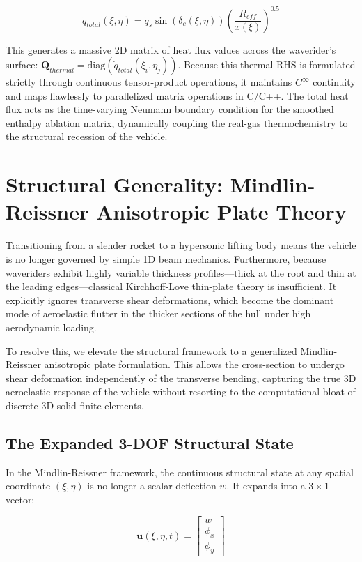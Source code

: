 \documentclass[11pt,a4paper]{article}
\theoremstyle{definition}
\numberwithin{equation}{section}
\begin{document}
$$\dot{q}_{total}(\xi, \eta) = \dot{q}_s \sin(\delta_c(\xi, \eta)) \left( \frac{R_{eff}}{x(\xi)} \right)^{0.5}$$

This generates a massive 2D matrix of heat flux values across the waverider's surface: $\mathbf{Q}_{thermal} = \text{diag}(\dot{q}_{total}(\xi_i, \eta_j))$. Because this thermal RHS is formulated strictly through continuous tensor-product operations, it maintains $C^\infty$ continuity and maps flawlessly to parallelized matrix operations in C/C++. The total heat flux acts as the time-varying Neumann boundary condition for the smoothed enthalpy ablation matrix, dynamically coupling the real-gas thermochemistry to the structural recession of the vehicle.

\section{Structural Generality: Mindlin-Reissner Anisotropic Plate Theory}
\label{sec:structural_generality}
Transitioning from a slender rocket to a hypersonic lifting body means the vehicle is no longer governed by simple 1D beam mechanics. Furthermore, because waveriders exhibit highly variable thickness profiles—thick at the root and thin at the leading edges—classical Kirchhoff-Love thin-plate theory is insufficient. It explicitly ignores transverse shear deformations, which become the dominant mode of aeroelastic flutter in the thicker sections of the hull under high aerodynamic loading.

To resolve this, we elevate the structural framework to a generalized Mindlin-Reissner anisotropic plate formulation. This allows the cross-section to undergo shear deformation independently of the transverse bending, capturing the true 3D aeroelastic response of the vehicle without resorting to the computational bloat of discrete 3D solid finite elements.

\subsection{The Expanded 3-DOF Structural State}
In the Mindlin-Reissner framework, the continuous structural state at any spatial coordinate $(\xi, \eta)$ is no longer a scalar deflection $w$. It expands into a $3 \times 1$ vector:

$$\mathbf{u}(\xi, \eta, t) = \begin{bmatrix} w \\ \phi_x \\ \phi_y \end{bmatrix}$$
\end{document}
